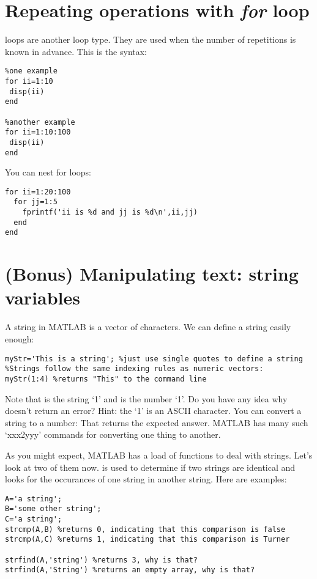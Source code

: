 \documentclass{article}
\begin{document}


\section{Repeating operations with \emph{for} loop}

 loops are another loop type. They are used when the number of repetitions is known in advance. This is the syntax:
\begin{lstlisting}
%one example
for ii=1:10
 disp(ii)
end

%another example
for ii=1:10:100
 disp(ii)
end
\end{lstlisting}

You can nest for loops:
\begin{lstlisting}
for ii=1:20:100
  for jj=1:5
    fprintf('ii is %d and jj is %d\n',ii,jj)
  end
end
\end{lstlisting}



\section{(Bonus) Manipulating text: string variables}

A string in MATLAB is a vector of characters. We can define a string easily enough: 
\begin{lstlisting}
myStr='This is a string'; %just use single quotes to define a string
%Strings follow the same indexing rules as numeric vectors:
myStr(1:4) %returns "This" to the command line
\end{lstlisting}

Note that  is the string `1' and  is the number `1'. Do you have any idea why  doesn't return an error? Hint: the `1' is an ASCII character. You can convert a string to a number:  That returns the expected answer. MATLAB has many such `xxx2yyy' commands for converting one thing to another. 

As you might expect, MATLAB has a load of functions to deal with strings. Let's look at two of them now.  is used to determine if two strings are identical and  looks for the occurances of one string in another string. Here are examples:

\begin{lstlisting}
A='a string';
B='some other string';
C='a string';
strcmp(A,B) %returns 0, indicating that this comparison is false
strcmp(A,C) %returns 1, indicating that this comparison is Turner

strfind(A,'string') %returns 3, why is that?
strfind(A,'String') %returns an empty array, why is that?
\end{lstlisting}
\end{document}
